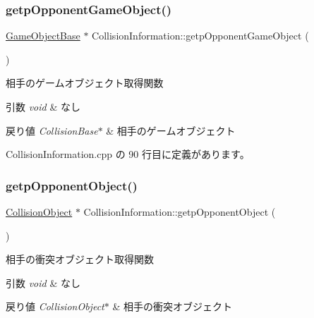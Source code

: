 \subsubsection{\texorpdfstring{getp\+Opponent\+Game\+Object()}{getpOpponentGameObject()}}
{\footnotesize\ttfamily \mbox{\hyperlink{class_game_object_base}{Game\+Object\+Base}} $\ast$ Collision\+Information\+::getp\+Opponent\+Game\+Object (\begin{DoxyParamCaption}{ }\end{DoxyParamCaption})}



相手のゲームオブジェクト取得関数 


\begin{DoxyParams}{引数}
{\em void} & なし \\
\hline
\end{DoxyParams}

\begin{DoxyRetVals}{戻り値}
{\em Collision\+Base$\ast$} & 相手のゲームオブジェクト \\
\hline
\end{DoxyRetVals}


 Collision\+Information.\+cpp の 90 行目に定義があります。

\mbox{\label{class_collision_information_aecf0536a8fe6f6bf33f294d8ee9402e2}} 
\subsubsection{\texorpdfstring{getp\+Opponent\+Object()}{getpOpponentObject()}}
{\footnotesize\ttfamily \mbox{\hyperlink{class_collision_object}{Collision\+Object}} $\ast$ Collision\+Information\+::getp\+Opponent\+Object (\begin{DoxyParamCaption}{ }\end{DoxyParamCaption})}



相手の衝突オブジェクト取得関数 


\begin{DoxyParams}{引数}
{\em void} & なし \\
\hline
\end{DoxyParams}

\begin{DoxyRetVals}{戻り値}
{\em Collision\+Object$\ast$} & 相手の衝突オブジェクト \\
\hline
\end{DoxyRetVals}



